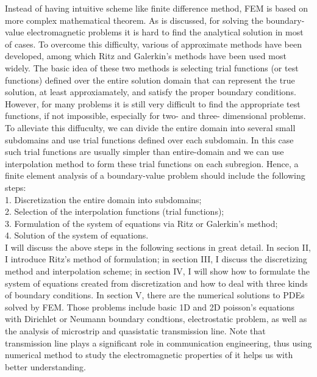 \documentclass[journal]{IEEEtran}
\begin{document}
Instead of having intuitive scheme like finite difference method, FEM is based on more complex mathematical theorem. As is discussed, for solving the boundary-value electromagnetic problems it is hard to find the analytical solution in most of cases. To overcome this difficulty, various of approximate methods have been developed, among which Ritz and Galerkin's methods have been used most widely. The basic idea of these two methods is selecting trial functions (or test functions) defined over the entire solution domain that can represent the true solution, at least approxiamately, and satisfy the proper boundary conditions. However, for many problems it is still very difficult to find the appropriate test functions, if not impossible, especially for two- and three- dimensional problems. To alleviate this diffuculty, we can divide the entire domain into several small subdomains and use trial functions defined over each subdomain. In this case such trial functions are usually simpler than entire-domain and we can use interpolation method to form these trial functions on each subregion. Hence, a finite element analysis of a boundary-value problem should include the following steps:\\
1. Discretization the entire domain into subdomains;\\
2. Selection of the interpolation functions (trial functions);\\
3. Formulation of the system of equations via Ritz or Galerkin's method;\\
4. Solution of the system of equations.\\ 
I will discuss the above steps in the following sections in great detail. In secion II, I introduce Ritz's method of formulation; in section III, I discuss the discretizing method and interpolation scheme; in section IV, I will show how to formulate the system of equations created from discretization and how to deal with three kinds of boundary conditions. In section V, there are the numerical solutions to PDEs solved by FEM. Those problems include basic 1D and 2D poisson's equations with Dirichlet or Neumann boundary condtions, electrostatic problem, as well as the analysis of microstrip and quasistatic transmission line. Note that transmission line plays a significant role in communication engineering, thus using numerical method to study the electromagnetic properties of it helps us with better understanding.  
\end{document}

